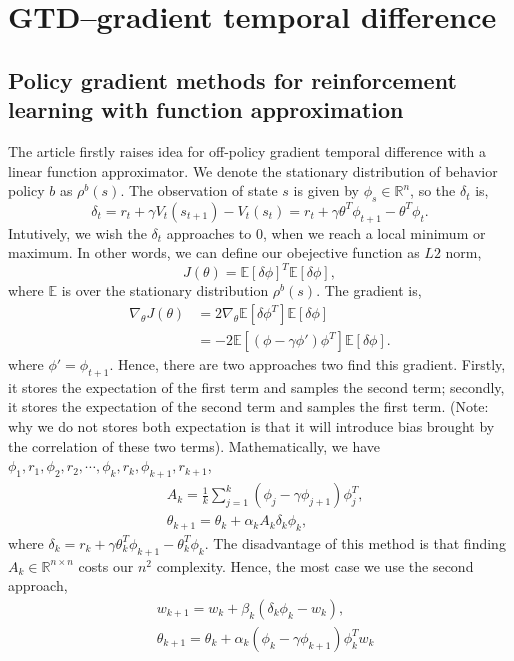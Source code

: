 \documentclass[11pt,a4paper]{article}
\def\E{\mathbb{E}}
\begin{document}

\section{GTD--gradient temporal difference}
\subsection{ Policy gradient methods for reinforcement learning with function approximation}
The article\cite{NIPS2008_3626} firstly raises idea for off-policy gradient temporal difference with a linear function approximator. We denote the stationary distribution of behavior policy $b$ as $\rho^{b}(s)$. The observation of state $s$ is given by $\phi_s \in \mathbb{R}^n$, so the $\delta_t$ is,
\begin{equation}
\delta_t = r_{t} + \gamma V_t(s_{t+1}) - V_t(s_t) = r_t + \gamma \theta^T\phi_{t+1} -\theta^T \phi_t.
\end{equation}
Intutively, we wish the $\delta_t$ approaches to $0$, when we reach a local minimum or maximum. In other words, we can define our obejective function as $L2$ norm,
\begin{equation}
J(\theta) = \E[\delta \phi]^T \E[\delta \phi],
\end{equation}
where $\E$ is over the stationary distribution $\rho^b(s)$. The gradient is,
\begin{align}
\nabla_{\theta}J(\theta)& = 2 \nabla_{\theta}\E[\delta \phi^T] \E[\delta \phi] \\ 
& = -2\E[(\phi-\gamma\phi')\phi^T]\E[\delta\phi].
\end{align}
where $\phi' = \phi_{t+1}$. Hence, there are two approaches two find this gradient. Firstly, it stores the expectation of the first term and samples the second term; secondly, it stores the expectation of the second term and samples the first term. (Note: why we do not stores both expectation is that it will introduce bias brought by the correlation of these two terms). Mathematically, we have $\phi_1,r_1,\phi_2,r_2,\cdots, \phi_k, r_k,\phi_{k+1},r_{k+1}$,
\begin{align}
& A_k = \frac{1}{k}\sum_{j=1}^k(\phi_j-\gamma\phi_{j+1})\phi_j^T, \\ 
& \theta_{k+1} = \theta_k + \alpha_k A_k \delta_k\phi_k,
\end{align}
where $\delta_k = r_k + \gamma \theta_k^T\phi_{k+1}-\theta_k^T\phi_k$. The disadvantage of this method is that finding $A_k \in \mathbb{R}^{n\times n}$ costs our $n^2$ complexity. Hence, the most case we use the second approach,
\begin{align}
& w_{k+1} = w_k + \beta_k (\delta_k\phi_k - w_k), \\ 
& \theta_{k+1} = \theta_k + \alpha_k(\phi_k-\gamma\phi_{k+1})\phi_k^T w_k
\end{align}
\end{document}
